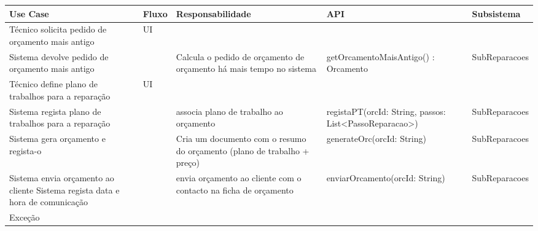 \documentclass[../relatorio.tex]{subfiles}
\begin{document}
\begin{landscape}
    \begin{table}[!h]
        \centering
        \begin{tabular}{|p{5cm}|p{1cm}|p{4cm}|p{6cm}|p{3cm}|}
            \hline
            \rowcolor{gray!20!white}
            Use Case & Fluxo & Responsabilidade & API & Subsistema \\
            \hline
            \rowcolor{yellow}
            Técnico solicita pedido de orçamento mais antigo
                     & 
            UI
                     & 
                     & 
                     & 
            \\
            \hline
            Sistema devolve pedido de orçamento mais antigo
                     & 
                     & 
            Calcula o pedido de orçamento de orçamento há mais tempo no sistema
                     & 
            getOrcamentoMaisAntigo() : Orcamento
                     & 
            SubReparacoes
            \\
            \hline
            \rowcolor{yellow}
            Técnico define plano de trabalhos para a reparação
                     & 
            UI 
                     & 
                     & 
                     & 
            \\
            \hline
            Sistema regista plano de trabalhos para a reparação
                     & 
                     & 
            associa plano de trabalho ao orçamento
                     & 
            registaPT(orcId: String, passos: List<PassoReparacao>)
                     & 
            SubReparacoes
            \\
            \hline
            Sistema gera orçamento e regista-o
                     & 
                     & 
            Cria um documento com o resumo do orçamento (plano de trabalho + preço)
                     & 
            generateOrc(orcId: String)
                     & 
            SubReparacoes
            \\
            \hline
            Sistema envia orçamento ao cliente
            Sistema regista data e hora de comunicação
                     & 
                     & 
            envia orçamento ao cliente com o contacto na ficha de orçamento
                     & 
            enviarOrcamento(orcId: String)
                     & 
            SubReparacoes
            \\
            \hline
            \rowcolor{red!30}
            Exceção
                     & 

\end{tabular}
\end{table}
\end{landscape}
\end{document}
